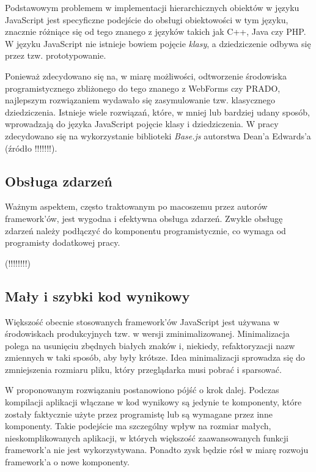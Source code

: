Podstawowym problemem w implementacji hierarchicznych obiektów w języku JavaScript jest
specyficzne podejście do obsługi obiektowości w tym języku, znacznie różniące się od
tego znanego z języków takich jak C++, Java czy PHP. W języku JavaScript nie istnieje
bowiem pojęcie \emph{klasy}, a dziedziczenie odbywa się przez tzw. prototypowanie.

Ponieważ zdecydowano się na, w miarę możliwości, odtworzenie środowiska programistycznego
zbliżonego do tego znanego z WebForms czy PRADO, najlepszym rozwiązaniem wydawało się
zasymulowanie tzw. klasycznego dziedziczenia. Istnieje wiele rozwiązań, które, w mniej
lub bardziej udany sposób, wprowadzają do języka JavaScript pojęcie klasy i dziedziczenia.
W pracy zdecydowano się na wykorzystanie biblioteki \emph{Base.js} autorstwa Dean'a Edwards'a
(źródło !!!!!!!).

\subsection{Obsługa zdarzeń}

Ważnym aspektem, często traktowanym po macoszemu przez autorów framework'ów, jest wygodna
i efektywna obsługa zdarzeń. Zwykle obsługę zdarzeń należy podłączyć do komponentu
programistycznie, co wymaga od programisty dodatkowej pracy.

(!!!!!!!!)

\subsection{Mały i szybki kod wynikowy}

Większość obecnie stosowanych framework'ów JavaScript jest używana w środowiskach produkcyjnych
tzw. w wersji zminimalizowanej. Minimalizacja polega na usunięciu zbędnych białych znaków i,
niekiedy, refaktoryzacji nazw zmiennych w taki sposób, aby były krótsze. Idea minimalizacji
sprowadza się do zmniejszenia rozmiaru pliku, który przeglądarka musi pobrać i sparsować.

W proponowanym rozwiązaniu postanowiono pójść o krok dalej. Podczas kompilacji aplikacji
włączane w kod wynikowy są jedynie te komponenty, które zostały faktycznie użyte przez
programistę lub są wymagane przez inne komponenty. Takie podejście ma szczególny wpływ
na rozmiar małych, nieskomplikowanych aplikacji, w których większość zaawansowanych
funkcji framework'a nie jest wykorzystywana. Ponadto zysk będzie rósł w miarę rozwoju
framework'a o nowe komponenty.

